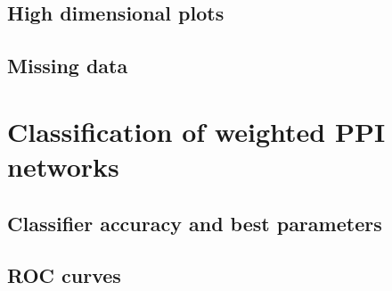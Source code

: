 
\subsection{High dimensional plots}




\subsection{Missing data}


\section{Classification of weighted PPI networks}

\subsection{Classifier accuracy and best parameters}



\subsection{ROC curves}




